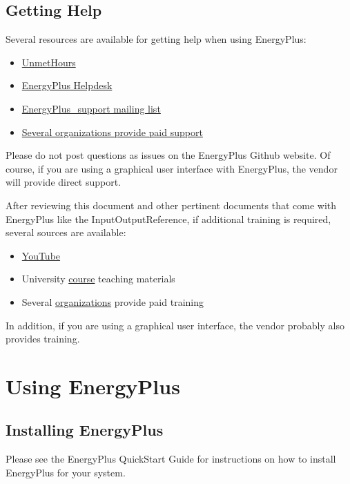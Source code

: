 \section{Getting Help \label{subsec:Getting-Help}}

Several resources are available for getting help when using EnergyPlus:
\begin{itemize}
\item \href{https://unmethours.com/questions/}{UnmetHours}
\item \href{http://energyplus.helpserve.com/}{EnergyPlus Helpdesk}
\item \href{https://groups.yahoo.com/neo/groups/EnergyPlus_Support/info}{EnergyPlus\_support mailing list}
\item \href{https://buildingenergysoftwaretools.com/?capabilities=Support+Services&keys=EnergyPlus}{Several organizations provide paid support}
\end{itemize}
Please do not post questions as issues on the EnergyPlus Github website.
Of course, if you are using a graphical user interface with EnergyPlus,
the vendor will provide direct support.

After reviewing this document and other pertinent documents that come
with EnergyPlus like the InputOutputReference, if additional training
is required, several sources are available:
\begin{itemize}
\item \href{https://www.youtube.com/results?search_query=energyplus}{YouTube}
\item University \href{https://energyplus.net/support}{course} teaching
materials
\item Several \href{https://www.buildingenergysoftwaretools.com/?capabilities=Training+Services&keys=EnergyPlus}{organizations}
provide paid training
\end{itemize}
In addition, if you are using a graphical user interface, the vendor
probably also provides training.

\chapter{Using EnergyPlus \label{sec:Using-EnergyPlus}}

\section{Installing EnergyPlus}

Please see the EnergyPlus QuickStart Guide for instructions on how
to install EnergyPlus for your system.

